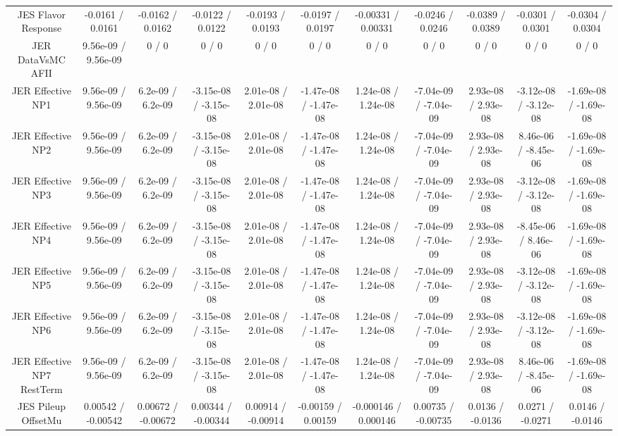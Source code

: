 \begin{table}[htbp]
\begin{center}
\begin{tabular}{|c|c|c|c|c|c|c|c|c|c|c|}
  JES Flavor Response & -0.0161 / 0.0161 & -0.0162 / 0.0162 & -0.0122 / 0.0122 & -0.0193 / 0.0193 & -0.0197 / 0.0197 & -0.00331 / 0.00331 & -0.0246 / 0.0246 & -0.0389 / 0.0389 & -0.0301 / 0.0301 & -0.0304 / 0.0304 \\ 
  JER DataVsMC AFII & 9.56e-09 / 9.56e-09 & 0 / 0 & 0 / 0 & 0 / 0 & 0 / 0 & 0 / 0 & 0 / 0 & 0 / 0 & 0 / 0 & 0 / 0 \\ 
  JER Effective NP1 & 9.56e-09 / 9.56e-09 & 6.2e-09 / 6.2e-09 & -3.15e-08 / -3.15e-08 & 2.01e-08 / 2.01e-08 & -1.47e-08 / -1.47e-08 & 1.24e-08 / 1.24e-08 & -7.04e-09 / -7.04e-09 & 2.93e-08 / 2.93e-08 & -3.12e-08 / -3.12e-08 & -1.69e-08 / -1.69e-08 \\ 
  JER Effective NP2 & 9.56e-09 / 9.56e-09 & 6.2e-09 / 6.2e-09 & -3.15e-08 / -3.15e-08 & 2.01e-08 / 2.01e-08 & -1.47e-08 / -1.47e-08 & 1.24e-08 / 1.24e-08 & -7.04e-09 / -7.04e-09 & 2.93e-08 / 2.93e-08 & 8.46e-06 / -8.45e-06 & -1.69e-08 / -1.69e-08 \\ 
  JER Effective NP3 & 9.56e-09 / 9.56e-09 & 6.2e-09 / 6.2e-09 & -3.15e-08 / -3.15e-08 & 2.01e-08 / 2.01e-08 & -1.47e-08 / -1.47e-08 & 1.24e-08 / 1.24e-08 & -7.04e-09 / -7.04e-09 & 2.93e-08 / 2.93e-08 & -3.12e-08 / -3.12e-08 & -1.69e-08 / -1.69e-08 \\ 
  JER Effective NP4 & 9.56e-09 / 9.56e-09 & 6.2e-09 / 6.2e-09 & -3.15e-08 / -3.15e-08 & 2.01e-08 / 2.01e-08 & -1.47e-08 / -1.47e-08 & 1.24e-08 / 1.24e-08 & -7.04e-09 / -7.04e-09 & 2.93e-08 / 2.93e-08 & -8.45e-06 / 8.46e-06 & -1.69e-08 / -1.69e-08 \\ 
  JER Effective NP5 & 9.56e-09 / 9.56e-09 & 6.2e-09 / 6.2e-09 & -3.15e-08 / -3.15e-08 & 2.01e-08 / 2.01e-08 & -1.47e-08 / -1.47e-08 & 1.24e-08 / 1.24e-08 & -7.04e-09 / -7.04e-09 & 2.93e-08 / 2.93e-08 & -3.12e-08 / -3.12e-08 & -1.69e-08 / -1.69e-08 \\ 
  JER Effective NP6 & 9.56e-09 / 9.56e-09 & 6.2e-09 / 6.2e-09 & -3.15e-08 / -3.15e-08 & 2.01e-08 / 2.01e-08 & -1.47e-08 / -1.47e-08 & 1.24e-08 / 1.24e-08 & -7.04e-09 / -7.04e-09 & 2.93e-08 / 2.93e-08 & -3.12e-08 / -3.12e-08 & -1.69e-08 / -1.69e-08 \\ 
  JER Effective NP7 RestTerm & 9.56e-09 / 9.56e-09 & 6.2e-09 / 6.2e-09 & -3.15e-08 / -3.15e-08 & 2.01e-08 / 2.01e-08 & -1.47e-08 / -1.47e-08 & 1.24e-08 / 1.24e-08 & -7.04e-09 / -7.04e-09 & 2.93e-08 / 2.93e-08 & 8.46e-06 / -8.45e-06 & -1.69e-08 / -1.69e-08 \\ 
  JES Pileup OffsetMu & 0.00542 / -0.00542 & 0.00672 / -0.00672 & 0.00344 / -0.00344 & 0.00914 / -0.00914 & -0.00159 / 0.00159 & -0.000146 / 0.000146 & 0.00735 / -0.00735 & 0.0136 / -0.0136 & 0.0271 / -0.0271 & 0.0146 / -0.0146 \\ 

\end{tabular}
\end{center}
\end{table}
